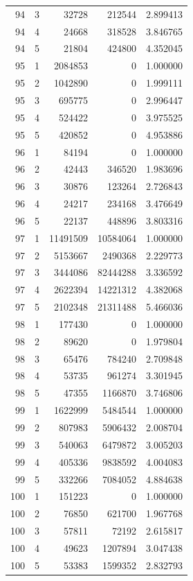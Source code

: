\begin{longtable}{rrrrr}
94 & 3 & 32728 & 212544 & 2.899413 \\
94 & 4 & 24668 & 318528 & 3.846765 \\
94 & 5 & 21804 & 424800 & 4.352045 \\
95 & 1 & 2084853 & 0 & 1.000000 \\
95 & 2 & 1042890 & 0 & 1.999111 \\
95 & 3 & 695775 & 0 & 2.996447 \\
95 & 4 & 524422 & 0 & 3.975525 \\
95 & 5 & 420852 & 0 & 4.953886 \\
96 & 1 & 84194 & 0 & 1.000000 \\
96 & 2 & 42443 & 346520 & 1.983696 \\
96 & 3 & 30876 & 123264 & 2.726843 \\
96 & 4 & 24217 & 234168 & 3.476649 \\
96 & 5 & 22137 & 448896 & 3.803316 \\
97 & 1 & 11491509 & 10584064 & 1.000000 \\
97 & 2 & 5153667 & 2490368 & 2.229773 \\
97 & 3 & 3444086 & 82444288 & 3.336592 \\
97 & 4 & 2622394 & 14221312 & 4.382068 \\
97 & 5 & 2102348 & 21311488 & 5.466036 \\
98 & 1 & 177430 & 0 & 1.000000 \\
98 & 2 & 89620 & 0 & 1.979804 \\
98 & 3 & 65476 & 784240 & 2.709848 \\
98 & 4 & 53735 & 961274 & 3.301945 \\
98 & 5 & 47355 & 1166870 & 3.746806 \\
99 & 1 & 1622999 & 5484544 & 1.000000 \\
99 & 2 & 807983 & 5906432 & 2.008704 \\
99 & 3 & 540063 & 6479872 & 3.005203 \\
99 & 4 & 405336 & 9838592 & 4.004083 \\
99 & 5 & 332266 & 7084052 & 4.884638 \\
100 & 1 & 151223 & 0 & 1.000000 \\
100 & 2 & 76850 & 621700 & 1.967768 \\
100 & 3 & 57811 & 72192 & 2.615817 \\
100 & 4 & 49623 & 1207894 & 3.047438 \\
100 & 5 & 53383 & 1599352 & 2.832793 \\
\bottomrule
\end{longtable}
